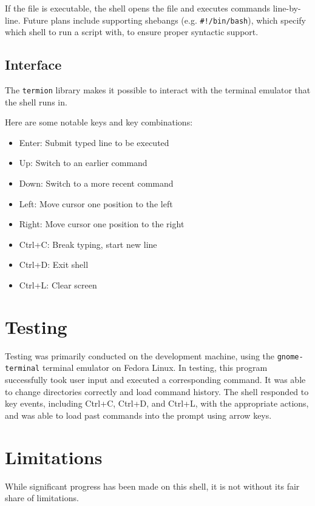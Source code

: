 \documentclass[12pt,twoside]{report} %
\begin{document}
	If the file is executable, the shell opens the file and executes commands line-by-line. Future plans include supporting shebangs (e.g. \verb|#!/bin/bash|), which specify which shell to run a script with, to ensure proper syntactic support.

	\subsection{Interface} \label{sec:interface}
	The \verb|termion| library makes it possible to interact with the terminal emulator that the shell runs in.
	
	Here are some notable keys and key combinations:
	
	\begin{itemize}[noitemsep,topsep=0pt]
	    \item Enter: Submit typed line to be executed
	    \item Up: Switch to an earlier command
	    \item Down: Switch to a more recent command
	    \item Left: Move cursor one position to the left
	    \item Right: Move cursor one position to the right
	    \item Ctrl+C: Break typing, start new line
	    \item Ctrl+D: Exit shell
	    \item Ctrl+L: Clear screen
	\end{itemize}

	\section{Testing} \label{sec:testing}
	Testing was primarily conducted on the development machine, using the \verb|gnome-terminal| terminal emulator on Fedora Linux. In testing, this program successfully took user input and executed a corresponding command. It was able to change directories correctly and load command history. The shell responded to key events, including Ctrl+C, Ctrl+D, and Ctrl+L, with the appropriate actions, and was able to load past commands into the prompt using arrow keys.

	\section{Limitations} \label{sec:limitations}
	While significant progress has been made on this shell, it is not without its fair share of limitations.
	
\end{document}
